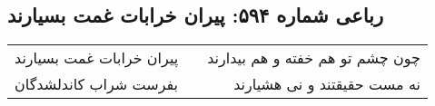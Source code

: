 \begin{center}
\section*{رباعی شماره ۵۹۴: پیران خرابات غمت بسیارند}
\label{sec:0594}
\begin{longtable}{l p{0.5cm} r}
پیران خرابات غمت بسیارند
&&
چون چشم تو هم خفته و هم بیدارند
\\
بفرست شراب کاندلشدگان
&&
نه مست حقیقتند و نی هشیارند
\\
\end{longtable}
\end{center}
